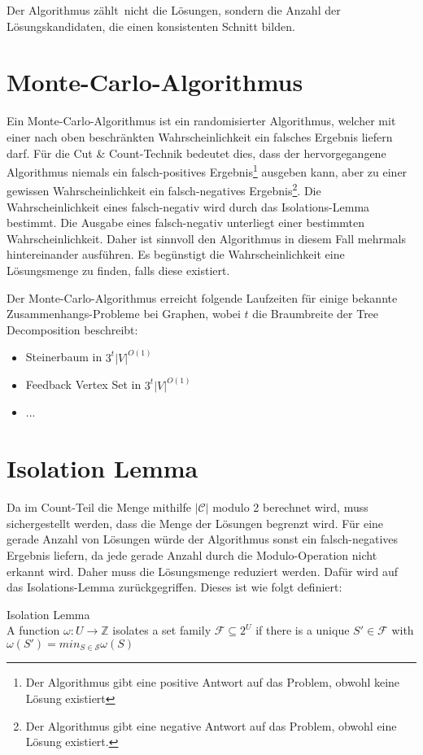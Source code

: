 Der Algorithmus \glqq zählt\grqq ~nicht die Lösungen, sondern die Anzahl der Lösungskandidaten, die einen konsistenten Schnitt bilden.

\section{Monte-Carlo-Algorithmus}
\label{sec:cc_monte}
Ein Monte-Carlo-Algorithmus ist ein randomisierter Algorithmus, welcher mit einer nach oben beschränkten Wahrscheinlichkeit ein falsches Ergebnis liefern darf. 
Für die Cut \& Count-Technik bedeutet dies, dass der hervorgegangene Algorithmus niemals ein falsch-positives Ergebnis\footnote{Der Algorithmus gibt eine positive Antwort auf das Problem, obwohl keine Lösung existiert} ausgeben kann, aber zu einer gewissen Wahrscheinlichkeit ein falsch-negatives Ergebnis\footnote{Der Algorithmus gibt eine negative Antwort auf das Problem, obwohl eine Lösung existiert.}. 
Die Wahrscheinlichkeit eines falsch-negativ wird durch das Isolations-Lemma bestimmt. 
Die Ausgabe eines falsch-negativ unterliegt einer bestimmten Wahrscheinlichkeit. Daher ist sinnvoll den Algorithmus in diesem Fall mehrmals hintereinander ausführen. Es begünstigt die Wahrscheinlichkeit eine Lösungsmenge zu finden, falls diese existiert.

Der Monte-Carlo-Algorithmus erreicht folgende Laufzeiten für einige bekannte Zusammenhangs-Probleme bei Graphen, wobei $t$ die Braumbreite der Tree Decomposition beschreibt:
\begin{itemize}
\item Steinerbaum in $3^t |V|^{O(1)}$
\item Feedback Vertex Set in $3^t|V|^{O(1)}$
\item ...
\end{itemize}

\section{Isolation Lemma}
\label{sec:cc_iso}
Da im Count-Teil die Menge mithilfe $|\mathcal{C}|$ modulo 2 berechnet wird, muss sichergestellt werden, dass die Menge der Lösungen begrenzt wird. 
Für eine gerade Anzahl von Lösungen würde der Algorithmus sonst ein falsch-negatives Ergebnis liefern, da jede gerade Anzahl durch die Modulo-Operation nicht erkannt wird. 
Daher muss die Lösungsmenge reduziert werden. Dafür wird auf das Isolations-Lemma zurückgegriffen. Dieses ist wie folgt definiert:

\begin{definition}
Isolation Lemma\\
 A function $\omega : U \rightarrow \mathbb{Z}$ isolates a set family $\mathcal{F} \subseteq 2^U$ if there is a unique $S' \in \mathcal{F}$ with $\omega (S')=min_{S \in \mathcal{S}} \omega(S)$\\
\end{definition}

